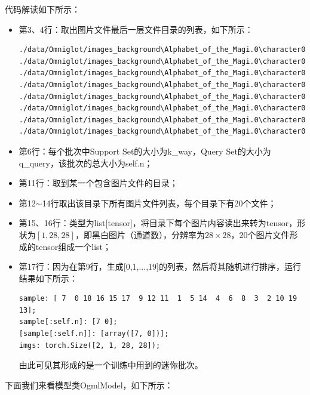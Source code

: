 代码解读如下所示：
\begin{itemize}
\item 第3、4行：取出图片文件最后一层文件目录的列表，如下所示：
\begin{lstlisting}
./data/Omniglot/images_background\Alphabet_of_the_Magi.0\character01
./data/Omniglot/images_background\Alphabet_of_the_Magi.0\character02
./data/Omniglot/images_background\Alphabet_of_the_Magi.0\character03
./data/Omniglot/images_background\Alphabet_of_the_Magi.0\character04
./data/Omniglot/images_background\Alphabet_of_the_Magi.0\character05
./data/Omniglot/images_background\Alphabet_of_the_Magi.0\character06
./data/Omniglot/images_background\Alphabet_of_the_Magi.0\character07
./data/Omniglot/images_background\Alphabet_of_the_Magi.0\character08
\end{lstlisting}
\item 第6行：每个批次中Support Set的大小为k\_way，Query Set的大小为q\_query，该批次的总大小为self.n；
\item 第11行：取到某一个包含图片文件的目录；
\item 第12$\sim$14行取出该目录下所有图片文件列表，每个目录下有20个文件；
\item 第15、16行：类型为list[tensor]，将目录下每个图片内容读出来转为tensor，形状为$[1, 28, 28]$，即黑白图片（通道数），分辨率为$28 \times 28$，20个图片文件形成的tensor组成一个list；
\item 第17行：因为在第9行，生成[0,1,...,19]的列表，然后将其随机进行排序，运行结果如下所示：
\begin{lstlisting}
sample: [ 7  0 18 16 15 17  9 12 11  1  5 14  4  6  8  3  2 10 19 13];
sample[:self.n]: [7 0];
[sample[:self.n]]: [array([7, 0])];
imgs: torch.Size([2, 1, 28, 28]);
\end{lstlisting}
由此可见其形成的是一个训练中用到的迷你批次。
\end{itemize}
下面我们来看模型类OgmlModel，如下所示：
